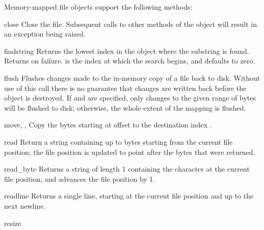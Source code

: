 Memory-mapped file objects support the following methods:


\begin{methoddesc}{close}{}
Close the file.  Subsequent calls to other methods of the object
will result in an exception being raised.
\end{methoddesc}

\begin{methoddesc}{find}{string}
Returns the lowest index in the object where the substring
 is found.  Returns  on failure.   is
the index at which the search begins, and defaults to zero.
\end{methoddesc}

\begin{methoddesc}{flush}{}
Flushes changes made to the in-memory copy of a file back to disk.
Without use of this call there is no guarantee that changes are
written back before the object is destroyed.  If  and
 are specified, only changes to the given range of bytes
will be flushed to disk; otherwise, the whole extent of the mapping is
flushed.
\end{methoddesc}

\begin{methoddesc}{move}{, , }
Copy the  bytes starting at offset  
to the destination index .
\end{methoddesc}

\begin{methoddesc}{read}{}
Return a string containing up to  bytes starting from the
current file position; the file position is updated to point after the
bytes that were returned. 
\end{methoddesc}

\begin{methoddesc}{read_byte}{}
Returns a string of length 1 containing the character at the current
file position, and advances the file position by 1.
\end{methoddesc}

\begin{methoddesc}{readline}{}
Returns a single line, starting at the current file position and up to 
the next newline.
\end{methoddesc}

\begin{methoddesc}{resize}{}
\end{methoddesc}

